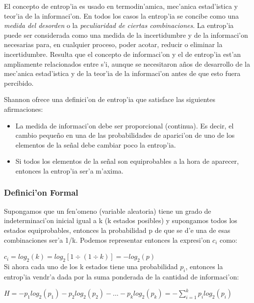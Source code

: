 \documentclass[a4paper,10pt]{article}
\begin{document}
\vspace*{5 mm}
El concepto de entrop'ia es usado en termodin'amica, mec'anica estad'istica y teor'ia de la informaci'on. En todos los casos la entrop'ia se concibe como una \textit{medida del desorden} o la \textit{peculiaridad de ciertas combinaciones}. La entrop'ia puede ser considerada como una medida de la incertidumbre y de la informaci'on necesarias para, en cualquier proceso, poder acotar, reducir o eliminar la incertidumbre. Resulta que el concepto de informaci'on y el de entrop'ia est'an ampliamente relacionados entre s'i, aunque se necesitaron a\~nos de desarrollo de la mec'anica estad'istica y de la teor'ia de la informaci'on antes de que esto fuera percibido.

\vspace*{5 mm}
Shannon ofrece una definici'on de entrop'ia que satisface las siguientes afirmaciones:

\begin{itemize}
	\item La medida de informaci'on debe ser proporcional (continua). Es decir, el cambio peque\~no en una de las probabilidades de aparici'on de uno de los elementos de la se\~nal debe cambiar poco la entrop'ia.
	\item Si todos los elementos de la se\~nal son equiprobables a la hora de aparecer, entonces la entrop'ia ser'a m'axima.	
\end{itemize}

\subsubsection{Definici'on Formal}

Supongamos que un fen'omeno (variable aleatoria) tiene un grado de indeterminaci'on inicial igual a k (k estados posibles) y supongamos todos los estados equiprobables, entonces la probabilidad p de que se d'e una de esas combinaciones ser'a 1/k. Podemos representar entonces la expresi'on  $c_{i}$ como:

\vspace*{5 mm}
$c_{i} = log_{2}(k) = log_{2}\left[ 1 \div (1 \div k)\right] = -log_{2}(p)$
\\

Si ahora cada uno de los k estados tiene una probabilidad $p_{i}$, entonces la entrop'ia vendr'a dada por la suma ponderada de la cantidad de informaci'on:

\vspace*{5 mm}
$H = -p_{1}log_{2}(p_{1}) - p_{2}log_{2}(p_{2}) - ... -p_{k}log_{2}(p_{k}) = -\sum^{k}_{i=1} p_{i}log_{2}(p_{i})$
\\
\end{document}

